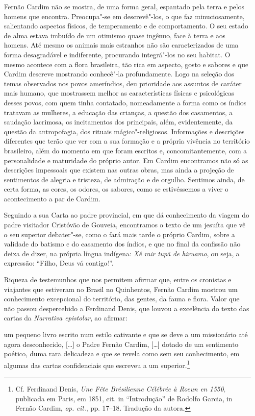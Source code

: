 Fernão Cardim não se mostra, de uma forma geral, espantado pela terra
e pelos homens que encontra. Preocupa"-se em descrevê"-los, o que faz
minuciosamente, salientando aspectos físicos, de temperamento e de
comportamento. O seu estado de alma estava imbuído de um otimismo
quase ingênuo, face à terra e aos homens. Até mesmo os animais mais
estranhos não são caracterizados de uma forma desagradável e
indiferente, procurando integrá"-los no seu habitat. O mesmo acontece
com a flora brasileira, tão rica em aspecto, gosto e sabores e que
Cardim descreve mostrando conhecê"-la profundamente. Logo na seleção
dos temas observados nos povos ameríndios, deu prioridade aos assuntos
de caráter mais humano, que mostrassem melhor as características
físicas e psicológicas desses povos, com quem tinha contatado,
nomeadamente a forma como os índios tratavam as mulheres, a educação
das crianças, a questão dos casamentos, a saudação lacrimosa, os
incitamentos dos principais, além, evidentemente, da questão da
antropofagia, dos rituais mágico"-religiosos. 
Informações e descrições diferentes que terão que ver com a sua
formação e a própria vivência no território brasileiro, além do momento
em que foram escritos e, concomitantemente, com a personalidade e
maturidade do próprio autor. Em Cardim encontramos não só as descrições
impessoais que existem nas outras obras, mas ainda a projeção de
sentimentos de alegria e tristeza, de admiração e de orgulho.
Sentimos ainda, de certa forma, as cores, os odores, os sabores, como
se estivéssemos a viver o acontecimento a par de Cardim.

Seguindo a sua Carta ao padre provincial, em que dá conhecimento da
viagem do padre visitador Cristóvão de Gouveia, encontramos o texto de
um jesuíta que vê o seu superior debater"-se, como o fará mais tarde o
próprio Cardim, sobre a validade do batismo e do casamento dos índios,
e que no final da confissão não deixa de dizer, na própria língua
indígena: \textit{Xê rair tupã de hiruamo}, ou seja, a expressão: ``Filho, Deus vá contigo!''. 

Riqueza de testemunhos que nos permitem afirmar que, entre os
cronistas e viajantes que estiveram no Brasil no Quinhentos, Fernão
Cardim mostrou um conhecimento excepcional do território, das gentes,
da fauna e flora. Valor que não passou despercebido a Ferdinand Denis,
que louvou a excelência do texto das cartas da \textit{Narrativa
epistolar}, ao afirmar:

\begin{hedraquote}
um pequeno livro escrito num estilo cativante e que se deve a um missionário
até agora desconhecido, [\ldots{}] o Padre Fernão Cardim, [\ldots{}] dotado de um
sentimento poético, duma rara delicadeza e que se revela como sem seu
conhecimento, em algumas das cartas confidenciais que escreveu a um
superior.\footnote{ Cf. Ferdinand Denis, \textit{Une Fête Brésilienne 
Célébrée à Roeun en 1550}, publicada em Paris, em 1851,
cit. in ``Introdução'' de Rodolfo Garcia, in Fernão Cardim, \textit{op. cit.}, 
pp. 17--18. Tradução da autora.} 
\end{hedraquote}

